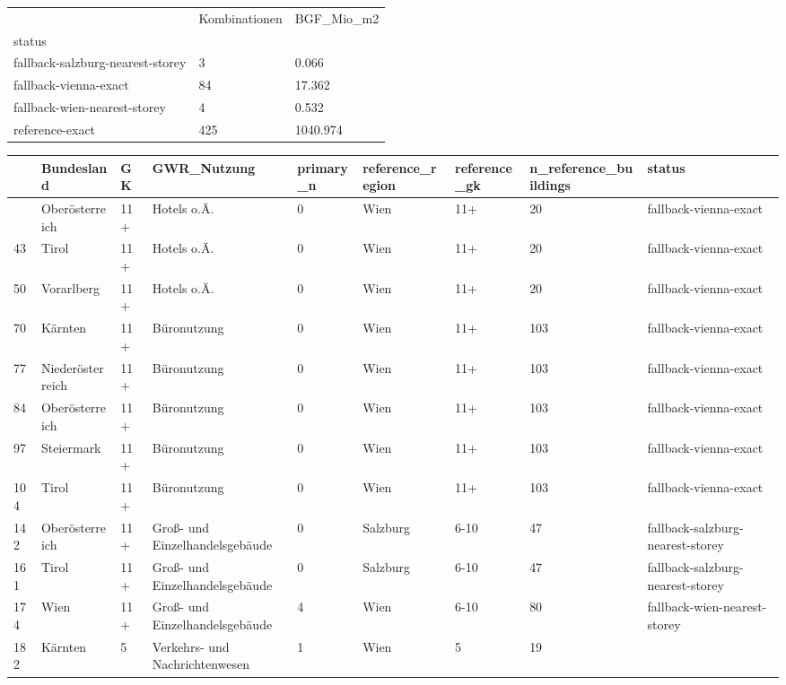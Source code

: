 \documentclass[
  ngerman,
  a4paper,
  DIV=11]{scrreprt}
\newcounter{none} %
\begin{document}
{\def\LTcaptype{none} %
\begin{longtable}[]{@{}lll@{}}
\toprule\noalign{}
& Kombinationen & BGF\_Mio\_m2 \\
status & & \\
\midrule\noalign{}
\endhead
\bottomrule\noalign{}
\endlastfoot
fallback-salzburg-nearest-storey & 3 & 0.066 \\
fallback-vienna-exact & 84 & 17.362 \\
fallback-wien-nearest-storey & 4 & 0.532 \\
reference-exact & 425 & 1040.974 \\
\end{longtable}
}

{\def\LTcaptype{none} %
\begin{longtable}[]{@{}lllllllll@{}}
\toprule\noalign{}
& Bundesland & GK & GWR\_Nutzung & primary\_n & reference\_region &
reference\_gk & n\_reference\_buildings & status \\
\midrule\noalign{}
\endhead
\bottomrule\noalign{}
\endlastfoot
24 & Oberösterreich & 11+ & Hotels o.Ä. & 0 & Wien & 11+ & 20 &
fallback-vienna-exact \\
43 & Tirol & 11+ & Hotels o.Ä. & 0 & Wien & 11+ & 20 &
fallback-vienna-exact \\
50 & Vorarlberg & 11+ & Hotels o.Ä. & 0 & Wien & 11+ & 20 &
fallback-vienna-exact \\
70 & Kärnten & 11+ & Büronutzung & 0 & Wien & 11+ & 103 &
fallback-vienna-exact \\
77 & Niederösterreich & 11+ & Büronutzung & 0 & Wien & 11+ & 103 &
fallback-vienna-exact \\
84 & Oberösterreich & 11+ & Büronutzung & 0 & Wien & 11+ & 103 &
fallback-vienna-exact \\
97 & Steiermark & 11+ & Büronutzung & 0 & Wien & 11+ & 103 &
fallback-vienna-exact \\
104 & Tirol & 11+ & Büronutzung & 0 & Wien & 11+ & 103 &
fallback-vienna-exact \\
142 & Oberösterreich & 11+ & Groß- und Einzelhandelsgebäude & 0 &
Salzburg & 6-10 & 47 & fallback-salzburg-nearest-storey \\
161 & Tirol & 11+ & Groß- und Einzelhandelsgebäude & 0 & Salzburg & 6-10
& 47 & fallback-salzburg-nearest-storey \\
174 & Wien & 11+ & Groß- und Einzelhandelsgebäude & 4 & Wien & 6-10 & 80
& fallback-wien-nearest-storey \\
182 & Kärnten & 5 & Verkehrs- und Nachrichtenwesen & 1 & Wien & 5 & 19 &

\end{longtable}}
\end{document}
